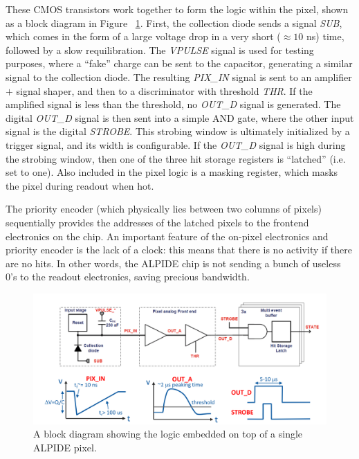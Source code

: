 These CMOS transistors work together to form the logic within the pixel, shown as a block diagram in Figure ~\ref{fig:alpide_l}. First, the collection diode sends a signal \textit{SUB}, which comes in the form of a large voltage drop in a very short ($\approx 10$ ns) time, followed by a slow requilibration. The \textit{VPULSE} signal is used for testing purposes, where a ``fake'' charge can be sent to the capacitor, generating a similar signal to the collection diode. The resulting \textit{PIX\_IN} signal is sent to an amplifier $+$ signal shaper, and then to a discriminator with threshold \textit{THR}. If the amplified signal is less than the threshold, no \textit{OUT\_D} signal is generated. The digital \textit{OUT\_D} signal is then sent into a simple AND gate, where the other input signal is the digital \textit{STROBE}. This strobing window is ultimately initialized by a trigger signal, and its width is configurable. If the \textit{OUT\_D} signal is high during the strobing window, then one of the three hit storage registers is ``latched'' (i.e. set to one). Also included in the pixel logic is a masking register, which masks the pixel during readout when hot. 

The priority encoder (which physically lies between two columns of pixels) sequentially provides the addresses of the latched pixels to the frontend electronics on the chip. An important feature of the on-pixel electronics and priority encoder is the lack of a clock: this means that there is no activity if there are no hits. In other words, the ALPIDE chip is not sending a bunch of useless 0's to the readout electronics, saving precious bandwidth.

\begin{figure}
    \centering
    \includegraphics[width=1.0\textwidth]{figures/experiment/alpide_logic.png}
    \caption{A block diagram showing the logic embedded on top of a single ALPIDE pixel.}
    \label{fig:alpide_l}
\end{figure}

